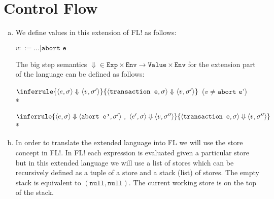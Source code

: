 \documentclass[10pt]{article}
\newcommand{\Rule}[3]{
    \label{rule:#1}
  \hfill
  \ensuremath{\inferrule{#2}{#3}}
  \hfill
}
\newcommand{\RuleWithCondition}[4]{
  \label{rule:#1}
  \hfill
  \ensuremath{\inferrule{#2}{#3}}
  (#4)
  \hfill
}
\begin{document}
\section{Control Flow}%
\begin{enumerate} [(a)]
    \item We define values in this extension of FL! as follows:

    $v ::= ... | \texttt{abort e}$

    The big step semantics $\Downarrow \in \texttt{Exp} \times \texttt{Env} \rightarrow \texttt{Value} \times \texttt{Env}$ for the extension part of the language can be defined as follows:

  \RuleWithCondition{}{
    \langle e, \sigma \rangle \Downarrow \langle v, \sigma' \rangle
  }{
    \langle \texttt{transaction e}, \sigma \rangle \Downarrow \langle v, \sigma' \rangle
  }{$v \neq \texttt{abort e'}$} \\*

  \Rule{}{
    \langle e, \sigma \rangle \Downarrow \langle \texttt{abort e'}, \sigma' \rangle ~, ~ \langle e', \sigma \rangle \Downarrow \langle v, \sigma'' \rangle
  }{
    \langle \texttt{transaction e}, \sigma \rangle \Downarrow \langle v, \sigma'' \rangle
  } \\*
    \item In order to translate the extended language into FL we will use the store concept in FL!. In FL! each expression is evaluated given a particular store but in this extended language we will use a list of stores which can be recursively defined as a tuple of a store and a stack (list) of stores. The empty stack is equivalent to $(\texttt{null}, \texttt{null})$. The current working store is on the top of the stack.


\end{enumerate}
\end{document}
